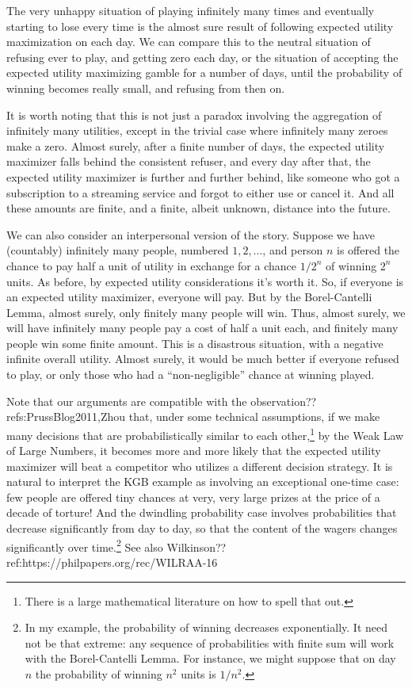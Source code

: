 The very unhappy situation of playing infinitely many times and eventually starting to lose every time is the almost 
sure result of following expected utility maximization on each day. We can compare this to the neutral situation of 
refusing ever to play, and getting zero each day, or the situation of accepting the expected utility maximizing gamble
for a number of days, until the probability of winning becomes really small, and refusing from then on.

It is worth noting that this is not just a paradox involving the aggregation of infinitely many utilities, except in the trivial
case where infinitely many zeroes make a zero. Almost surely, after a finite number of days, the expected utility maximizer
falls behind the consistent refuser, and every day after that, the expected utility maximizer is further and further behind,
like someone who got a subscription to a streaming service and forgot to either use or cancel it. And all these amounts are 
finite, and a finite, albeit unknown, distance into the future.

We can also consider an interpersonal version of the story. Suppose we have (countably) infinitely many people, numbered $1,2,...$, and person $n$ 
is offered the chance to pay half a unit of utility in exchange for a chance $1/2^n$ of winning $2^n$ units. As before, by expected utility
considerations it's worth it. So, if everyone is an expected utility maximizer, everyone will pay. But by the Borel-Cantelli Lemma, 
almost surely, only finitely many people will win. Thus, almost surely, we will have infinitely many people
pay a cost of half a unit each, and finitely many people win some finite amount. This is a disastrous situation, with a negative infinite
overall utility. Almost surely, it would be much better if everyone refused to play, or only those who had a ``non-negligible'' chance 
at winning played.

Note that our arguments are compatible with the observation??refs:PrussBlog2011,Zhou that, under some technical assumptions, if we make 
many decisions that are probabilistically similar to each other,\footnote{There is a large mathematical literature on how to spell that out.}
by the Weak Law of Large Numbers, it becomes more and more likely that the expected utility maximizer will beat a competitor who utilizes a 
different decision strategy. It is natural to interpret the KGB example as involving an exceptional one-time case: few people are offered
tiny chances at very, very large prizes at the price of a decade of torture! And the dwindling probability case involves probabilities that
decrease significantly from day to day, so that the content of the wagers changes significantly over time.\footnote{In my example, the 
probability of winning decreases exponentially. It need not be that extreme: any sequence of probabilities with finite sum will work with
the Borel-Cantelli Lemma. For instance, we might suppose that on day $n$ the probability of winning $n^2$ units is $1/n^2$.} See also 
Wilkinson??ref:https://philpapers.org/rec/WILRAA-16

